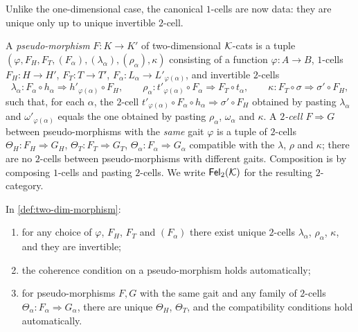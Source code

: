 Unlike the one-dimensional case, the canonical $1$-cells are now data: they
are unique only up to unique invertible $2$-cell.

\begin{definition}\label{def:two-dim-morphism}
A \emph{pseudo-morphism} $F\colon K\to K'$ of two-dimensional $\mathcal{K}$-cats is a
tuple $(\varphi,F_H,F_T,(F_\alpha),(\lambda_\alpha),(\rho_\alpha),\kappa)$
consisting of a function $\varphi\colon A\to B$, $1$-cells $F_H\colon H\to H'$,
$F_T\colon T\to T'$, $F_\alpha\colon L_\alpha\to L'_{\varphi(\alpha)}$, and invertible
$2$-cells
\[
\lambda_\alpha\colon F_\alpha\circ h_\alpha\Rightarrow h'_{\varphi(\alpha)}\circ F_H,\qquad
\rho_\alpha\colon t'_{\varphi(\alpha)}\circ F_\alpha\Rightarrow F_T\circ t_\alpha,\qquad
\kappa\colon F_T\circ\sigma\Rightarrow\sigma'\circ F_H,
\]
such that, for each $\alpha$, the $2$-cell $t'_{\varphi(\alpha)}\circ F_\alpha\circ h_\alpha\Rightarrow\sigma'\circ F_H$
obtained by pasting $\lambda_\alpha$ and $\omega'_{\varphi(\alpha)}$ equals the one
obtained by pasting $\rho_\alpha$, $\omega_\alpha$ and $\kappa$. A
\emph{$2$-cell} $F\Rightarrow G$ between pseudo-morphisms with the \emph{same}
gait $\varphi$ is a tuple of $2$-cells $\Theta_H\colon F_H\Rightarrow G_H$,
$\Theta_T\colon F_T\Rightarrow G_T$, $\Theta_\alpha\colon F_\alpha\Rightarrow G_\alpha$
compatible with the $\lambda$, $\rho$ and $\kappa$; there are no $2$-cells
between pseudo-morphisms with different gaits. Composition is by composing
$1$-cells and pasting $2$-cells. We write $\mathsf{Fel}_2(\mathcal{K})$ for the resulting
$2$-category.
\end{definition}

\begin{proposition}\label{prop:auto-pseudo}
In \cref{def:two-dim-morphism}:
\begin{enumerate}
\item for any choice of $\varphi$, $F_H$, $F_T$ and $(F_\alpha)$ there exist
  unique $2$-cells $\lambda_\alpha$, $\rho_\alpha$, $\kappa$, and they are
  invertible;
\item the coherence condition on a pseudo-morphism holds automatically;
\item for pseudo-morphisms $F,G$ with the same gait and any family of $2$-cells
  $\Theta_\alpha\colon F_\alpha\Rightarrow G_\alpha$, there are unique $\Theta_H$,
  $\Theta_T$, and the compatibility conditions hold automatically.
\end{enumerate}
\end{proposition}

